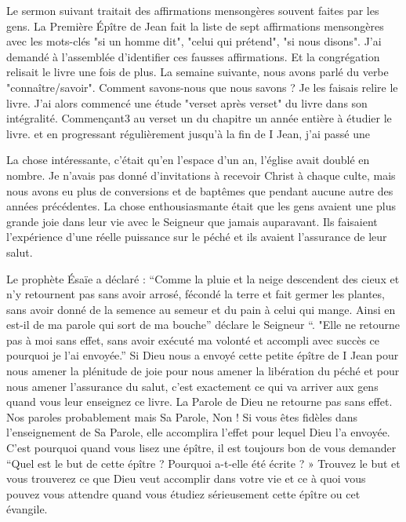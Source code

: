 Le sermon suivant traitait des affirmations mensongères souvent faites par les gens. La Première Épître de Jean fait la
liste de sept affirmations mensongères avec les mots-clés "si un homme dit", "celui qui prétend", "si nous disons". J'ai
demandé à l’assemblée d'identifier ces fausses affirmations. Et la congrégation relisait le livre une fois de plus. La
semaine suivante, nous avons parlé du verbe "connaître/savoir". Comment savons-nous que nous savons ? Je les
faisais relire le livre. J'ai alors commencé une étude "verset après verset" du livre dans son intégralité. Commençant3
au verset un du chapitre un
année entière à étudier le livre.
et
en
progressant régulièrement jusqu'à la fin de I Jean, j'ai passé une

La chose intéressante, c'était qu’en l’espace d’un an, l’église avait doublé en nombre. Je n’avais pas donné
d’invitations à recevoir Christ à chaque culte, mais nous avons eu plus de conversions et de baptêmes que pendant
aucune autre des années précédentes. La chose enthousiasmante était que les gens avaient une plus grande joie
dans leur vie avec le Seigneur que jamais auparavant. Ils faisaient l’expérience d’une réelle puissance sur le péché et
ils avaient l’assurance de leur salut.

Le prophète Ésaïe a déclaré : “Comme la pluie et la neige descendent des cieux et n’y retournent pas sans avoir
arrosé, fécondé la terre et fait germer les plantes, sans avoir donné de la semence au semeur et du pain à celui qui
mange. Ainsi en est-il de ma parole qui sort de ma bouche” déclare le Seigneur “. "Elle ne retourne pas à moi sans
effet, sans avoir exécuté ma volonté et accompli avec succès ce pourquoi je l’ai envoyée.” Si Dieu nous a envoyé
cette petite épître de I Jean pour nous amener la plénitude de joie pour nous amener la libération du péché et pour
nous amener l’assurance du salut, c’est exactement ce qui va arriver aux gens quand vous leur enseignez ce livre. La
Parole de Dieu ne retourne pas sans effet. Nos paroles probablement mais Sa Parole, Non ! Si vous êtes fidèles dans
l’enseignement de Sa Parole, elle accomplira l’effet pour lequel Dieu l’a envoyée. C’est pourquoi quand vous lisez une
épître, il est toujours bon de vous demander “Quel est le but de cette épître ? Pourquoi a-t-elle été écrite ? » Trouvez
le but et vous trouverez ce que Dieu veut accomplir dans votre vie et ce à quoi vous pouvez vous attendre quand
vous étudiez sérieusement cette épître ou cet évangile.

